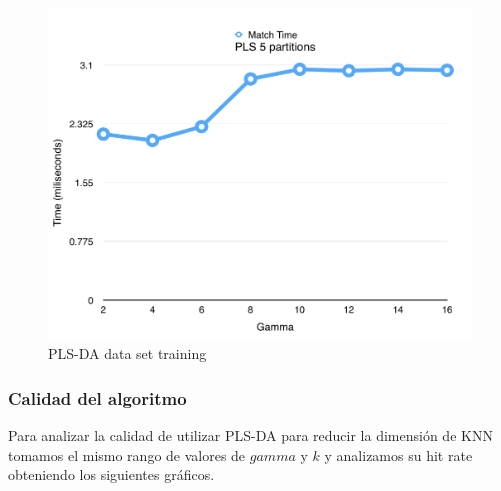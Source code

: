 \newpage

\begin{figure}[h!]
  \begin{center}
	\includegraphics[scale=0.7]{exp2/PLS-Match-Time.png}
	\caption{PLS-DA data set training}
  \end{center}
\end{figure}

\subsubsection*{Calidad del algoritmo}

Para analizar la calidad de utilizar PLS-DA para reducir la dimensión de KNN tomamos el mismo rango de valores de $gamma$ y $k$ y analizamos su hit rate obteniendo los siguientes gráficos.

